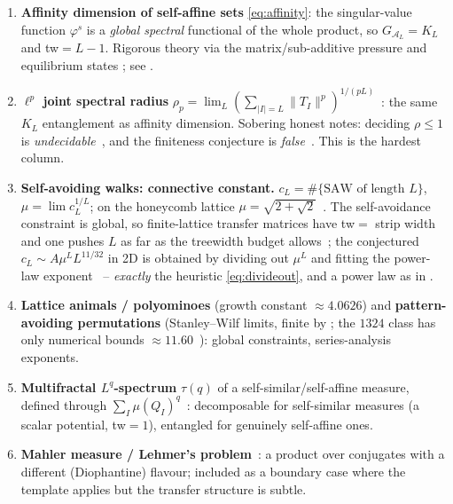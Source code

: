 \documentclass[11pt]{article}
\newcommand{\calA}{\mathcal{A}}
\newcommand{\graphform}[1]{G_{#1}}
\theoremstyle{plain}
\theoremstyle{definition}
\theoremstyle{remark}
\begin{document}
\begin{enumerate}[leftmargin=1.5em,itemsep=3pt]
\item \textbf{Affinity dimension of self-affine sets} \eqref{eq:affinity}: the
singular-value function $\varphi^s$ is a \emph{global spectral} functional of the
whole product, so $\graphform{\calA_L}=K_L$ and \textsf{tw}$=L-1$. Rigorous theory
via the matrix/sub-additive pressure and equilibrium states
\citep{falconer1988hausdorff,kaenmaki2004natural,morris2018matrix,barany2019hausdorff};
see .

\item \textbf{$\ell^p$ joint spectral radius}
$\rho_p=\lim_L(\sum_{|I|=L}\|T_I\|^p)^{1/(pL)}$~\citep{rota1960note,jungers2009joint}:
the same $K_L$ entanglement as affinity dimension. Sobering honest notes: deciding
$\rho\le1$ is \emph{undecidable}~\citep{blondel2000boundedness}, and the finiteness
conjecture is \emph{false}~\citep{bousch2002asymptotic}. This is the hardest column.

\item \textbf{Self-avoiding walks: connective constant.} $c_L=\#\{\text{SAW of
length }L\}$, $\mu=\lim c_L^{1/L}$; on the honeycomb lattice
$\mu=\sqrt{2+\sqrt2}$~\citep{duminil2012connective}. The self-avoidance constraint is
global, so finite-lattice transfer matrices have \textsf{tw}$=$ strip width and one
pushes $L$ as far as the treewidth budget allows~\citep{jensen2004enumeration}; the
conjectured $c_L\sim A\mu^L L^{11/32}$ in 2D is obtained by dividing out $\mu^L$ and
fitting the power-law exponent~\citep{madras1993self,guttmann2009polygons} --
\emph{exactly} the heuristic \eqref{eq:divideout}, and a power law as in
.

\item \textbf{Lattice animals / polyominoes} (growth constant $\approx4.0626$) and
\textbf{pattern-avoiding permutations} (Stanley--Wilf limits, finite by
\citet{marcus2004excluded}; the $1324$ class has only numerical bounds
$\approx11.60$~\citep{conway2018ts}): global constraints, series-analysis exponents.

\item \textbf{Multifractal $L^q$-spectrum} $\tau(q)$ of a self-similar/self-affine
measure, defined through $\sum_I\mu(Q_I)^q$~\citep{falconer1997techniques}:
decomposable for self-similar measures (a scalar potential, \textsf{tw}$=1$),
entangled for genuinely self-affine ones.

\item \textbf{Mahler measure / Lehmer's problem}~\citep{boyd1981speculations}: a
product over conjugates with a different (Diophantine) flavour; included as a
boundary case where the template applies but the transfer structure is subtle.
\end{enumerate}
\end{document}
